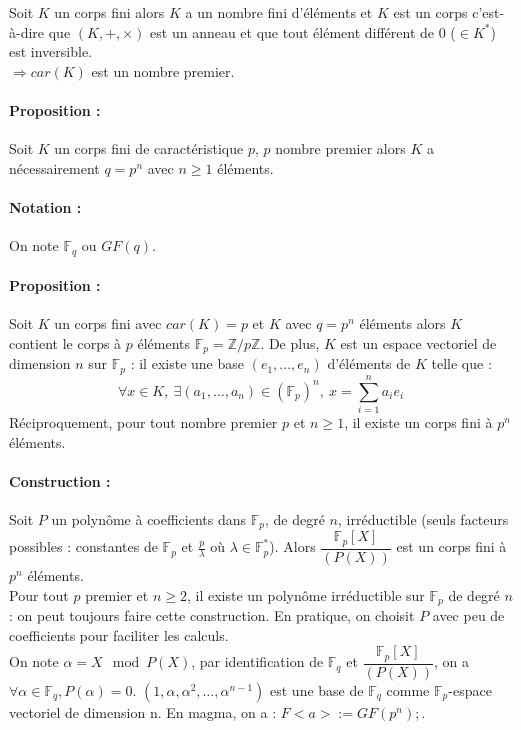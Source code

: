 \documentclass[12pt,a4paper]{report}
\begin{document}
Soit $K$ un corps fini alors $K$ a un nombre fini d'éléments et $K$ est un corps c'est-à-dire que $(K,+,\times)$ est un anneau et que tout élément différent de 0 ($\in K^*$) est inversible.\\
$\Rightarrow car(K)$ est un nombre premier.
\paragraph{Proposition :\\}
Soit $K$ un corps fini de caractéristique $p$, $p$ nombre premier alors $K$ a nécessairement $q=p^n$ avec $n\geqslant 1$ éléments.
\paragraph{Notation :} On note $\mathbb{F}_q$ ou $GF(q)$.
\paragraph{Proposition :\\}
Soit $K$ un corps fini avec $car(K) =p $ et $K$ avec $q=p^n$ éléments alors $K$ contient le corps à $p$ éléments $\mathbb{F}_p = \mathbb{Z}/p\mathbb{Z}$. De plus, $K$ est un espace vectoriel de dimension $n$ sur $\mathbb{F}_p$ : il existe une base $(e_1,\ldots,e_n)$ d'éléments de $K$ telle que :
$$ \forall x \in K,\ \exists (a_1,\ldots,a_n) \in (\mathbb{F}_p)^n,\ x=\sum_{i=1}^n a_i e_i $$
Réciproquement, pour tout nombre premier $p$ et $n \geqslant 1$, il existe un corps fini à $p^n$ éléments.
\paragraph{Construction :\\}
Soit $P$ un polynôme à coefficients dans $\mathbb{F}_p$, de degré $n$, irréductible (seuls facteurs possibles : constantes de $\mathbb{F}_p$ et $\frac{p}{\lambda}$ où $ \lambda \in \mathbb{F}_p^*$). Alors $\dfrac{\mathbb{F}_p[X]}{(P(X))}$ est un corps fini à $p^n$ éléments.\\
Pour tout $p$ premier et $n \geqslant 2$, il existe un polynôme irréductible sur $\mathbb{F}_p$ de degré $n$ : on peut toujours faire cette construction. En pratique, on choisit $P$ avec peu de coefficients pour faciliter les calculs.\\
On note $\alpha = X\mod P(X)$, par identification de $\mathbb{F}_q$ et $\dfrac{\mathbb{F}_p[X]}{(P(X))}$, on a $\forall \alpha \in \mathbb{F}_q, P(\alpha)=0$. $(1,\alpha,\alpha^2,\ldots,\alpha^{n-1})$ est une base de $\mathbb{F}_q$ comme $\mathbb{F}_p$-espace vectoriel de dimension n. En magma, on a : $F<a>:=GF(p^n);$.
\end{document}
